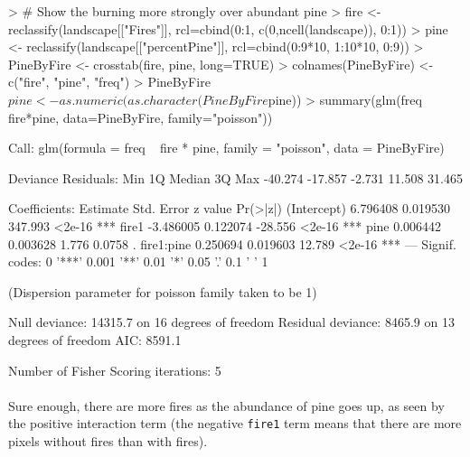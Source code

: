 \documentclass{article}
\begin{document}
\begin{Schunk}
\begin{Sinput}
> # Show the burning more strongly over abundant pine
> fire <- reclassify(landscape[["Fires"]], rcl=cbind(0:1, c(0,ncell(landscape)), 0:1))
> pine <- reclassify(landscape[["percentPine"]], rcl=cbind(0:9*10, 1:10*10, 0:9))
> PineByFire <- crosstab(fire, pine, long=TRUE)
> colnames(PineByFire) <- c("fire", "pine", "freq")
> PineByFire$pine <- as.numeric(as.character(PineByFire$pine))
> summary(glm(freq ~ fire*pine, data=PineByFire, family="poisson"))
\end{Sinput}
\begin{Soutput}
Call:
glm(formula = freq ~ fire * pine, family = "poisson", data = PineByFire)

Deviance Residuals: 
    Min       1Q   Median       3Q      Max  
-40.274  -17.857   -2.731   11.508   31.465  

Coefficients:
             Estimate Std. Error z value Pr(>|z|)    
(Intercept)  6.796408   0.019530 347.993   <2e-16 ***
fire1       -3.486005   0.122074 -28.556   <2e-16 ***
pine         0.006442   0.003628   1.776   0.0758 .  
fire1:pine   0.250694   0.019603  12.789   <2e-16 ***
---
Signif. codes:  0 '***' 0.001 '**' 0.01 '*' 0.05 '.' 0.1 ' ' 1

(Dispersion parameter for poisson family taken to be 1)

    Null deviance: 14315.7  on 16  degrees of freedom
Residual deviance:  8465.9  on 13  degrees of freedom
AIC: 8591.1

Number of Fisher Scoring iterations: 5
\end{Soutput}
\end{Schunk}

\paragraph{}
Sure enough, there are more fires as the abundance of pine goes up, as seen by the positive interaction term (the negative \texttt{fire1} term means that there are more pixels without fires than with fires).
\end{document}
